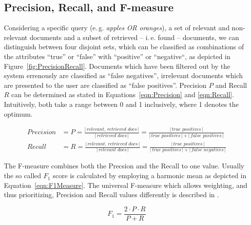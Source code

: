\documentclass[a4paper,twoside]{book}      %
\begin{document}

\subsection{Precision, Recall, and F-measure}

Considering a specific query (e.\,g. \textit{apples OR oranges}), a set of relevant and non-relevant documents and a subset of retrieved -- i.\,e. found -- documents, we can distinguish between four disjoint sets, which can be classified as combinations of the attributes ``true'' or ``false'' with ``positive'' or ``negative``, as depicted in Figure~\ref{fig:PrecisionRecall}. Documents which have been filtered out by the system errenously are classified as ``false negatives'', irrelevant documents which are presented to the user are classified as ``false positives''. Precision $P$ and Recall $R$ can be determined as stated in Equations~\ref{eqn:Precision} and \ref{eqn:Recall}. Intuitively, both take a range between 0 and 1 inclusively, where 1 denotes the optimum.

\begin{align}
%	
	\textit{Precision} &= P = \frac{\left|\,\textit{relevant, retrieved docs}\,\right|}{\left|\,\textit{retrieved docs}\,\right|} = \frac{\left|\,\textit{true positives}\,\right|}{\left|\,\textit{true positives}\,\right| + \left|\,\textit{false positives}\,\right|}
	\label{eqn:Precision} \\[5mm]
%	
	\textit{Recall} &= R = \frac{\left|\,\textit{relevant, retrieved docs}\,\right|}{\left|\,\textit{relevant docs}\,\right|} = \frac{\left|\,\textit{true positives}\,\right|}{\left|\,\textit{true positives}\,\right| + \left|\,\textit{false negatives}\,\right|}
	\label{eqn:Recall}
%	
\end{align}

The F-measure combines both the Precsion and the Recall to one value. Usually the so called $F_1$ score is calculated by employing a harmonic mean as depicted in Equation~\ref{eqn:F1Measure}. The universal F-measure which allows weighting, and thus prioritizing, Precision and Recall values differently is described in \cite[p.\,156]{Manning:2009}. 

\begin{equation}
	F_1 = \frac{2 \cdot P \cdot R}{P + R}
	\label{eqn:F1Measure}
\end{equation}
\end{document}
